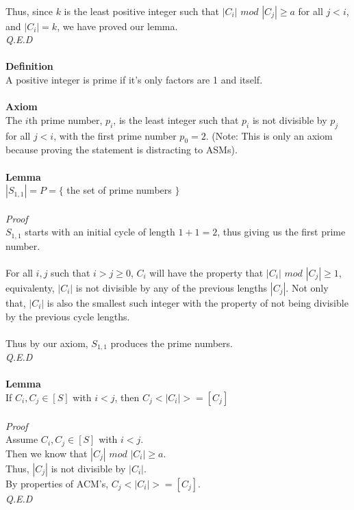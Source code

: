 \documentclass[a4paper,12pt]{article}
\begin{document}
\\ 
Thus, since $k$ is the least positive integer such that $|C_i|$ $mod$ $|C_j| \geq a$ for all $j < i$, and $|C_i| = k$, we have proved our lemma.\\
\textit{Q.E.D}\\
\\
\textbf{Definition}\\
A positive integer is prime if it's only factors are 1 and itself.\\
\\
\textbf{Axiom}\\
The $i$th prime number, $p_i$, is the least integer such that $p_i$ is not divisible by $p_j$ for all $j < i$, with the first prime number $p_0=2$. (Note: This is only an axiom because proving the statement is distracting to ASMs).\\
\\
\textbf{Lemma}\\
$|S_{1,1}| = P = \{$ the set of prime numbers $\}$\\
\\
\textit{Proof}\\
$S_{1,1}$ starts with an initial cycle of length $1 + 1 = 2$, thus giving us the first prime number.\\
\\
For all $i, j$ such that $i > j \geq 0$, $C_i$ will have the property that $|C_i|$ $mod$ $|C_j| \geq 1$, equivalenty, $|C_i|$ is not divisible by any of the previous lengths $|C_j|$. Not only that, $|C_i|$ is also the smallest such integer with the property of not being divisible by the previous cycle lengths.\\
\\
Thus by our axiom, $S_{1,1}$ produces the prime numbers.\\
\textit{Q.E.D}\\
\\
\textbf{Lemma}\\
If $C_i, C_j \in [S]$ with $i < j$, then $C_j<|C_i|> = [C_j]$\\
\\
\textit{Proof}\\  
Assume $C_i, C_j \in [S]$ with $i < j$.\\
Then we know that $|C_j|$ $mod$ $|C_i| \geq a$.\\
Thus, $|C_j|$ is not divisible by $|C_i|$.\\
By properties of ACM's, $C_j<|C_i|> = [C_j]$.\\
\textit{Q.E.D}\\ 
\end{document}
